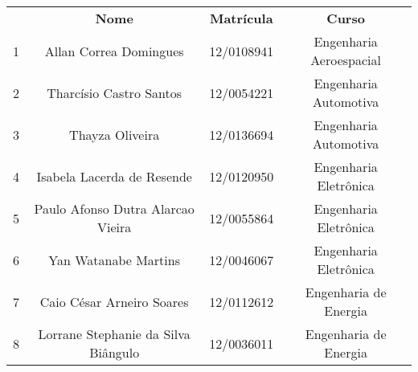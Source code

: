 \begin{resumo}

\begin{table}[h]
 {\renewcommand\arraystretch{1.25}
 \begin{tabular}{ l l l l }
  \cline{1-1}\cline{2-2}\cline{3-3}\cline{4-4}  
    \multicolumn{1}{|c|}{ } &
    \multicolumn{1}{c|}{\textbf{Nome}} &
    \multicolumn{1}{c|}{\textbf{Matrícula}} &
    \multicolumn{1}{c|}{\textbf{Curso}}
  \\  
  \cline{1-1}\cline{2-2}\cline{3-3}\cline{4-4}  
    \multicolumn{1}{|c|}{1} &
    \multicolumn{1}{c|}{Allan Correa Domingues} &
    \multicolumn{1}{c|}{12/0108941} &
    \multicolumn{1}{c|}{Engenharia Aeroespacial}
  \\  
  \cline{1-1}\cline{2-2}\cline{3-3}\cline{4-4}  
    \multicolumn{1}{|c|}{2} &
    \multicolumn{1}{c|}{Tharcísio Castro Santos} &
    \multicolumn{1}{c|}{12/0054221} &
    \multicolumn{1}{c|}{Engenharia Automotiva}
  \\  
  \cline{1-1}\cline{2-2}\cline{3-3}\cline{4-4}  
    \multicolumn{1}{|c|}{3} &
    \multicolumn{1}{c|}{Thayza Oliveira} &
    \multicolumn{1}{c|}{12/0136694} &
    \multicolumn{1}{c|}{Engenharia Automotiva}
  \\  
  \cline{1-1}\cline{2-2}\cline{3-3}\cline{4-4}  
    \multicolumn{1}{|c|}{4} &
    \multicolumn{1}{c|}{Isabela Lacerda de Resende} &
    \multicolumn{1}{c|}{12/0120950} &
    \multicolumn{1}{c|}{Engenharia Eletrônica}
  \\  
  \cline{1-1}\cline{2-2}\cline{3-3}\cline{4-4}  
    \multicolumn{1}{|c|}{5} &
    \multicolumn{1}{c|}{Paulo Afonso Dutra Alarcao Vieira} &
    \multicolumn{1}{c|}{12/0055864} &
    \multicolumn{1}{c|}{Engenharia Eletrônica}
  \\  
  \cline{1-1}\cline{2-2}\cline{3-3}\cline{4-4}  
    \multicolumn{1}{|c|}{6} &
    \multicolumn{1}{c|}{Yan Watanabe Martins} &
    \multicolumn{1}{c|}{12/0046067} &
    \multicolumn{1}{c|}{Engenharia Eletrônica}
  \\  
  \cline{1-1}\cline{2-2}\cline{3-3}\cline{4-4}  
    \multicolumn{1}{|c|}{7} &
    \multicolumn{1}{c|}{Caio César Arneiro Soares} &
    \multicolumn{1}{c|}{12/0112612  } &
    \multicolumn{1}{c|}{Engenharia de Energia}
  \\  
  \cline{1-1}\cline{2-2}\cline{3-3}\cline{4-4}  
    \multicolumn{1}{|c|}{8} &
    \multicolumn{1}{c|}{Lorrane  Stephanie da Silva Biângulo} &
    \multicolumn{1}{c|}{12/0036011} &
    \multicolumn{1}{c|}{Engenharia de Energia}

\end{tabular}}
\end{table}
\end{resumo}
